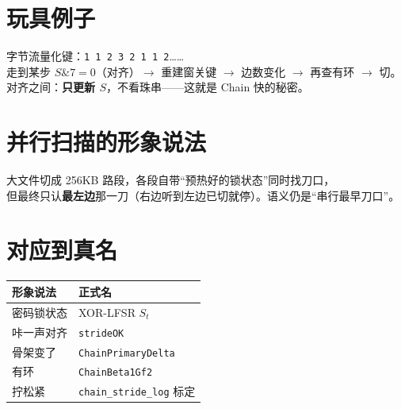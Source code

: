 \section{玩具例子}

\begin{toybox}[假装 $L=3$，即每约 8 次对齐一次]
字节流量化键：\texttt{1 1 2 3 2 1 1 2}……\\
走到某步 $S\&7=0$（对齐）$\to$ 重建窗关键 $\to$ 边数变化 $\to$ 再查有环 $\to$ 切。\\
对齐之间：\textbf{只更新 $S$}，不看珠串——这就是 Chain 快的秘密。
\end{toybox}

\section{并行扫描的形象说法}

大文件切成 256KB 路段，各段自带``预热好的锁状态''同时找刀口，\\
但最终只认\textbf{最左边}那一刀（右边听到左边已切就停）。语义仍是``串行最早刀口''。

\section{对应到真名}

\begin{center}
\begin{tabular}{@{}ll@{}}
\toprule
形象说法 & 正式名 \\
\midrule
密码锁状态 & XOR-LFSR $S_t$ \\
咔一声对齐 & \texttt{strideOK} \\
骨架变了 & \texttt{ChainPrimaryDelta} \\
有环 & \texttt{ChainBeta1Gf2} \\
拧松紧 & \texttt{chain\_stride\_log} 标定 \\
\bottomrule
\end{tabular}
\end{center}
